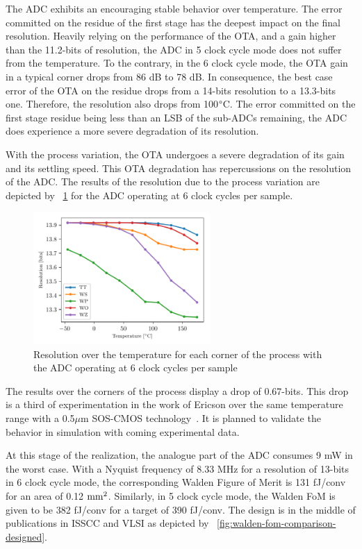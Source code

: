 The ADC exhibits an encouraging stable behavior over temperature. The error committed on the residue of the first stage has the deepest impact on the final resolution. Heavily relying on the performance of the OTA, and a gain higher than the 11.2-bits of resolution, the ADC in 5 clock cycle mode does not suffer from the temperature. To the contrary, in the 6 clock cycle mode, the OTA gain in a typical corner drops from 86 dB to 78 dB. In consequence, the best case error of the OTA on the residue drops from a 14-bits resolution to a 13.3-bits one. Therefore, the resolution also drops from 100$\degree$C. The error committed on the first stage residue being less than an LSB of the sub-ADCs remaining, the ADC does experience a more severe degradation of its resolution.

With the process variation, the OTA undergoes a severe degradation of its gain and its settling speed. This OTA degradation has repercussions on the resolution of the ADC. The results of the resolution due to the process variation are depicted by \figurename~\ref{fig:adc-res-schematic-temp-corners} for the ADC operating at 6 clock cycles per sample.

\begin{figure}[htp]
    \centering
    \includegraphics[width=0.6\textwidth]{Chapter5/Figs/preliminary/adc_real_ota_osr6_temp-corners.pdf}
    \caption{Resolution over the temperature for each corner of the process with the ADC operating at 6 clock cycles per sample}
    \label{fig:adc-res-schematic-temp-corners}
\end{figure}

The results over the corners of the process display a drop of 0.67-bits. This drop is a third of experimentation in the work of Ericson over the same temperature range with a 0.5$\mu$m SOS-CMOS technology~\cite{Ericson2004}. It is planned to validate the behavior in simulation with coming experimental data.

At this stage of the realization, the analogue part of the ADC consumes 9 mW in the worst case. With a Nyquist frequency of 8.33 MHz for a resolution of 13-bits in 6 clock cycle mode, the corresponding Walden Figure of Merit is 131 fJ/conv for an area of 0.12 $\rm mm^2$. Similarly, in 5 clock cycle mode, the Walden FoM is given to be 382 fJ/conv for a target of 390 fJ/conv. The design is in the middle of publications in ISSCC and VLSI as depicted by \figurename~\ref{fig:walden-fom-comparison-designed}.

